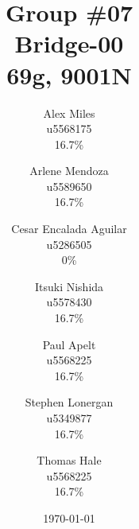 \documentclass[12pt,titlepage]{article}
\begin{document}
	
	\title{
		Group \#07 \\
		Bridge-00 \\
		69g, 9001N
	}
	\date{\today}
	\author{
		Alex Miles \\ u5568175 \\ 16.7\%
		\and Arlene Mendoza \\ u5589650 \\ 16.7\%
		\and Cesar Encalada Aguilar \\ u5286505 \\ 0\%
		\and Itsuki Nishida \\ u5578430 \\ 16.7\%
		\and Paul Apelt \\ u5568225 \\ 16.7\%
		\and Stephen Lonergan \\ u5349877 \\ 16.7\%
		\and Thomas Hale \\ u5568225 \\ 16.7\%
	}
	\maketitle
\end{document}
